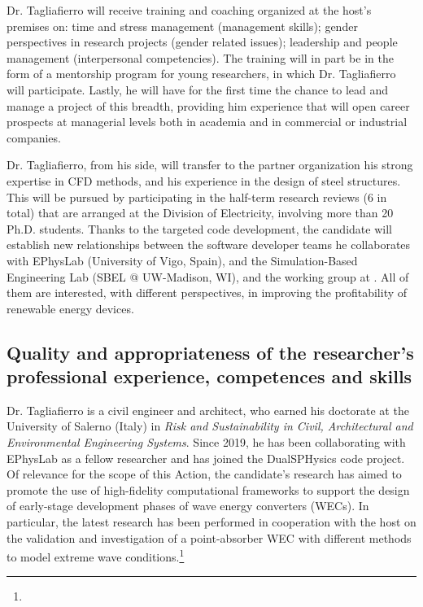 \begin{description}[font=$\bullet$\scshape\bfseries, leftmargin=0pt,noitemsep,topsep=1pt,]
\begin{description}[font=$\star$\scshape\bfseries, leftmargin=6pt,noitemsep,topsep=1pt,]
\item[\,Transferable skills.] Dr. Tagliafierro will receive training and coaching organized at the host's premises on: time and stress management (management skills); gender perspectives in research projects (gender related issues); leadership and people management (interpersonal competencies). The training will in part be in the form of a mentorship program for young researchers, in which Dr. Tagliafierro will participate. Lastly, he will have for the first time the chance to lead and manage a project of this breadth, providing him experience that will open career prospects at managerial levels both in academia and in commercial or industrial companies.
\end{description}
\item[\,Researcher to Host:] Dr. Tagliafierro, from his side, will transfer to the partner organization his strong expertise in CFD methods, and his experience in the design of steel structures. This will be pursued by participating in the half-term research reviews (6 in total) that are arranged at the Division of Electricity, involving more than 20 Ph.D. students. %
Thanks to the targeted code development, the candidate will establish new relationships between the software developer teams he collaborates with EPhysLab (University of Vigo, Spain), and the Simulation-Based Engineering Lab (SBEL @ UW-Madison, WI), and the working group at \UU. All of them are interested, with different perspectives, in improving the profitability of renewable energy devices.\vspace{-2ex}
\end{description}
\subsection{Quality and appropriateness of the researcher’s professional experience, competences and skills}\vspace{-1ex}

Dr. Tagliafierro is a civil engineer and architect, who earned his doctorate at the University of Salerno (Italy) in \textit{Risk and Sustainability in Civil, Architectural and Environmental Engineering Systems}. Since 2019, he has been collaborating with EPhysLab as a fellow researcher and has joined the DualSPHysics code project. Of relevance for the scope of this Action, the candidate's research has aimed to promote the use of high-fidelity computational frameworks to support the design of early-stage development phases of wave energy converters (WECs). In particular, the latest research has been performed in cooperation with the host on the validation and investigation of a point-absorber WEC with different methods to model extreme wave conditions.\footnote{}

